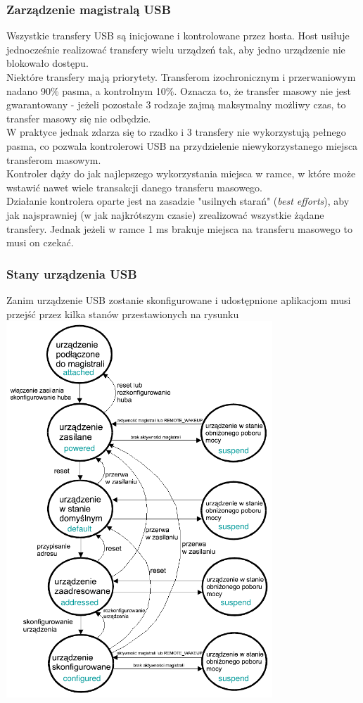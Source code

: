 		\subsubsection{Zarządzenie magistralą USB}
		Wszystkie transfery USB są inicjowane i kontrolowane przez hosta. Host usiłuje jednocześnie realizować transfery wielu urządzeń tak, aby jedno urządzenie nie blokowało dostępu.\\ 
		Niektóre transfery mają priorytety. Transferom izochronicznym i przerwaniowym nadano 90\% pasma, a kontrolnym 10\%. Oznacza to, że transfer masowy nie jest gwarantowany - jeżeli pozostałe 3 rodzaje zajmą maksymalny możliwy czas, to transfer masowy się nie odbędzie.\\
		W praktyce jednak zdarza się to rzadko i 3 transfery nie wykorzystują pełnego pasma, co pozwala kontrolerowi USB na przydzielenie niewykorzystanego miejsca transferom masowym.\\
		Kontroler dąży do jak najlepszego wykorzystania miejsca w ramce, w które może wstawić nawet wiele transakcji danego transferu masowego.\\
		Działanie kontrolera oparte jest na zasadzie "usilnych starań" (\emph{best efforts}), aby jak najsprawniej (w jak najkrótszym czasie) zrealizować wszystkie żądane transfery. Jednak jeżeli w ramce 1 ms brakuje miejsca na transferu masowego to musi on czekać.
		\subsubsection{Stany urządzenia USB}
		Zanim urządzenie USB zostanie skonfigurowane i udostępnione aplikacjom musi przejść przez kilka stanów przestawionych na rysunku\\
		\includegraphics[width=10cm]{./wyklady/USB_16_1.pdf}
